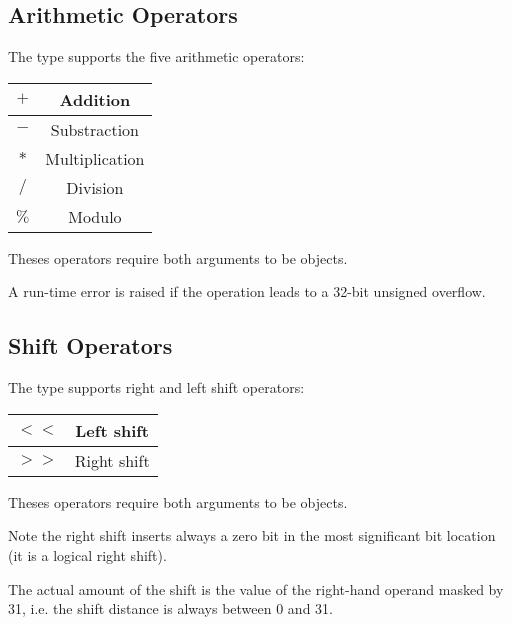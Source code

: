\subsection{Arithmetic Operators}

The  type supports the five arithmetic operators:\newline

\begin{tabular}{|c|c|}
\hline
$+$ & Addition \\
\hline
$-$ & Substraction \\
\hline
$*$ & Multiplication \\
\hline
$/$ & Division \\
\hline
$\%$ & Modulo \\
\hline
\end{tabular}\newline

Theses operators require both arguments to be  objects.\newline

A run-time error is raised if the operation leads to a 32-bit unsigned overflow.





\subsection{Shift Operators}


The  type supports right and left shift operators:\newline

\begin{tabular}{|c|c|}
\hline
$<<$ & Left shift \\
\hline
$>>$ & Right shift \\
\hline
\end{tabular}\newline

Theses operators require both arguments to be  objects.\newline

Note the right shift inserts always a zero bit in the most significant bit location (it is a logical right shift).\newline

The actual amount of the shift is the value of the right-hand operand masked by 31, i.e. the shift distance is always between 0 and 31.




